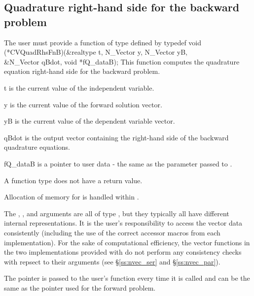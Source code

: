 \subsection{Quadrature right-hand side for the backward problem}
The user must provide a function of type  defined by
{
  typedef void (*CVQuadRhsFnB)(&realtype t, N\_Vector y, N\_Vector yB, \\
                               &N\_Vector qBdot, void *fQ\_dataB);
}
{
  This function computes the quadrature equation right-hand side for the
  backward problem.
}
{
  \begin{args}[fQ\_dataB]
  \item[t]
    is the current value of the independent variable.
  \item[y]
    is the current value of the forward solution vector.
  \item[yB]
    is the current value of the dependent variable vector.
  \item[qBdot]
    is the output vector containing the right-hand side of the backward quadrature
    equations.
  \item[fQ\_dataB]
    is a pointer to user data - the same as the       
    parameter passed to .   
  \end{args}
}
{
  A  function type does not have a return value.                        
}
{
  Allocation of memory for  is handled within {\cvodes}.

  The , , and  arguments are all of type ,
  but they  typically all have different internal representations. It is the user's 
  responsibility to access the vector data consistently (including the use of the 
  correct accessor macros from each {\nvector} implementation). For the sake of 
  computational efficiency, the vector functions in the two {\nvector} implementations 
  provided with {\cvodes} do not perform any consistency checks with repsect to their 
   arguments (see \S\ref{ss:nvec_ser} and \S\ref{ss:nvec_par}).

  The  pointer is passed to the user's  function every time 
  it is called and can be the same as the  pointer used for the forward problem.
}


